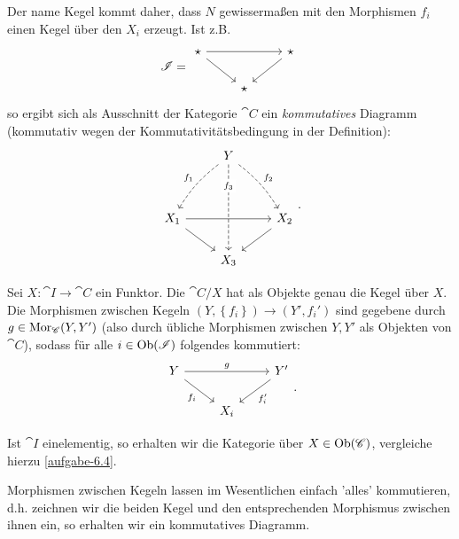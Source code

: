 \begin{dremark}
    Der name Kegel kommt daher, dass $N$ gewissermaßen mit den Morphismen  $f_i$ einen Kegel über den  $X_i$ erzeugt. Ist z.B.
     \[
         \cat{I} = 
    \begin{tikzcd}
        \star \ar{rr} \ar{dr} & & \star \ar{dl} \\
                              & \star
    \end{tikzcd}
\]
so ergibt sich als Ausschnitt der Kategorie $\cat{C}$ ein \textit{kommutatives} Diagramm (kommutativ wegen der Kommutativitätsbedingung in der Definition):
\[
\begin{tikzcd}
    & Y\ar[bend right = 10, dashed,swap]{ddl}{f_1} \ar[dashed, "f_3" description, near start]{ddd} \ar[bend left = 10, dashed]{ddr}{f_2} \\
    \\
    X_1 \ar{dr}\ar{rr} & & X_2 \ar{dl}\\
                & X_3
\end{tikzcd}
.\]

\end{dremark}

\begin{definition}[Kegelkategorie]\label{def:kegelkategorie}
    Sei $X: \cat{I} \to  \cat{C}$ ein Funktor. Die  $\cat{C} / X$ hat als Objekte genau die Kegel über $X$. Die Morphismen zwischen Kegeln $(Y, \left \{f_i\right\}) \to (Y', f_i')$ sind gegebene durch $g\in \operatorname{Mor}_{\mathscr{C}}(Y,Y')$ (also durch übliche Morphismen zwischen $Y,Y'$ als Objekten von  $\cat{C}$), sodass für alle $i\in \operatorname{Ob}(\mathscr{I})$ folgendes kommutiert:
    \[
    \begin{tikzcd}
        Y \ar{rr}{g} \ar[swap]{dr}{f_i} & & Y' \ar{dl}{f_i'} \\
                                        & X_i
    \end{tikzcd}
    .\] 
\end{definition}

\begin{oral}
    Ist $\cat{I}$ einelementig, so erhalten wir die Kategorie über  $X\in \operatorname{Ob}(\mathscr{C})$, vergleiche hierzu \autoref{aufgabe-6.4}.
\end{oral}

\begin{remark*}
    Morphismen zwischen Kegeln lassen im Wesentlichen einfach 'alles' kommutieren, d.h. zeichnen wir die beiden Kegel und den entsprechenden Morphismus zwischen ihnen ein, so erhalten wir ein kommutatives Diagramm.
\end{remark*}

